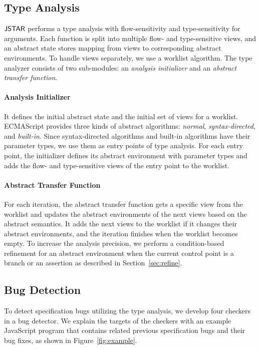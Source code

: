 \subsection{Type Analysis}\label{sec:overview-type-analysis}

$\tool$ performs a type analysis with flow-sensitivity and
type-sensitivity for arguments.
Each function is split into multiple flow- and type-sensitive views, and an
abstract state stores mapping from views to corresponding abstract environments.
To handle views separately, we use a worklist algorithm.
The type analyzer consists of two sub-modules: an \textit{analysis initializer} and an
\textit{abstract transfer function}.

\paragraph{Analysis Initializer} It defines the initial abstract state and the
initial set of views for a worklist. ECMAScript provides three
kinds of abstract algorithms: \textit{normal}, \textit{syntax-directed}, and
\textit{built-in}. Since syntax-directed algorithms and built-in algorithms have
their parameter types, we use them as entry points of type analysis.  For each entry point, the
initializer defines its abstract environment with parameter types and adds the
flow- and type-sensitive views of the entry point to the worklist.

\paragraph{Abstract Transfer Function} For each iteration, the abstract transfer function gets a
specific view from the worklist and updates the abstract environments of the next
views based on the abstract semantics.  It adds the next views to the worklist if
it changes their abstract environments, and the iteration finishes when
the worklist becomes empty.  To increase the analysis precision, we
perform a condition-based refinement for an abstract environment when the current
control point is a branch or an assertion as described in Section~\ref{sec:refine}.

\subsection{Bug Detection}\label{sec:overview-bug-detect}

To detect specification bugs utilizing the type analysis, we develop
four checkers in a bug detector.  We explain the targets of the checkers
with an example JavaScript program that contains related previous specification bugs and
their bug fixes, as shown in Figure~\ref{fig:example}.

